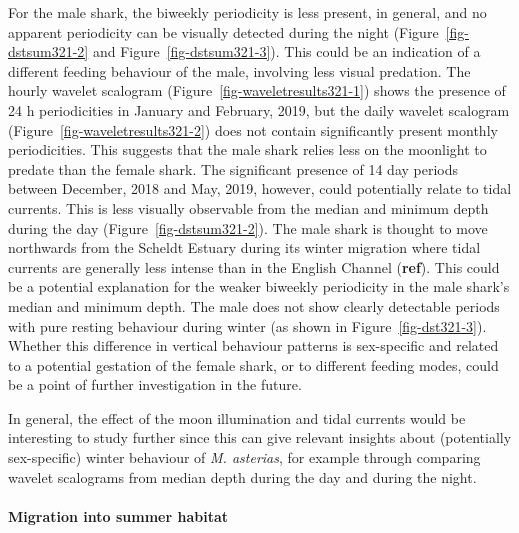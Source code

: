 \documentclass[
  authoryear,
  review,
  3p]{elsarticle}
\let\oldparagraph\paragraph
\renewcommand{\paragraph}[1]{\oldparagraph{#1}\mbox{}}
\begin{document}
For the male shark, the biweekly periodicity is less present, in
general, and no apparent periodicity can be visually detected during the
night (Figure~\ref{fig-dstsum321-2} and Figure~\ref{fig-dstsum321-3}).
This could be an indication of a different feeding behaviour of the
male, involving less visual predation. The hourly wavelet scalogram
(Figure~\ref{fig-waveletresults321-1}) shows the presence of 24 h
periodicities in January and February, 2019, but the daily wavelet
scalogram (Figure~\ref{fig-waveletresults321-2}) does not contain
significantly present monthly periodicities. This suggests that the male
shark relies less on the moonlight to predate than the female shark. The
significant presence of 14 day periods between December, 2018 and May,
2019, however, could potentially relate to tidal currents. This is less
visually observable from the median and minimum depth during the day
(Figure~\ref{fig-dstsum321-2}). The male shark is thought to move
northwards from the Scheldt Estuary during its winter migration where
tidal currents are generally less intense than in the English Channel
(\textbf{ref}). This could be a potential explanation for the weaker
biweekly periodicity in the male shark's median and minimum depth. The
male does not show clearly detectable periods with pure resting
behaviour during winter (as shown in Figure~\ref{fig-dst321-3}). Whether
this difference in vertical behaviour patterns is sex-specific and
related to a potential gestation of the female shark, or to different
feeding modes, could be a point of further investigation in the future.

In general, the effect of the moon illumination and tidal currents would
be interesting to study further since this can give relevant insights
about (potentially sex-specific) winter behaviour of \emph{M. asterias},
for example through comparing wavelet scalograms from median depth
during the day and during the night.

\hypertarget{sec-disc-summermig}{%
\paragraph{Migration into summer habitat}\label{sec-disc-summermig}}
\end{document}
